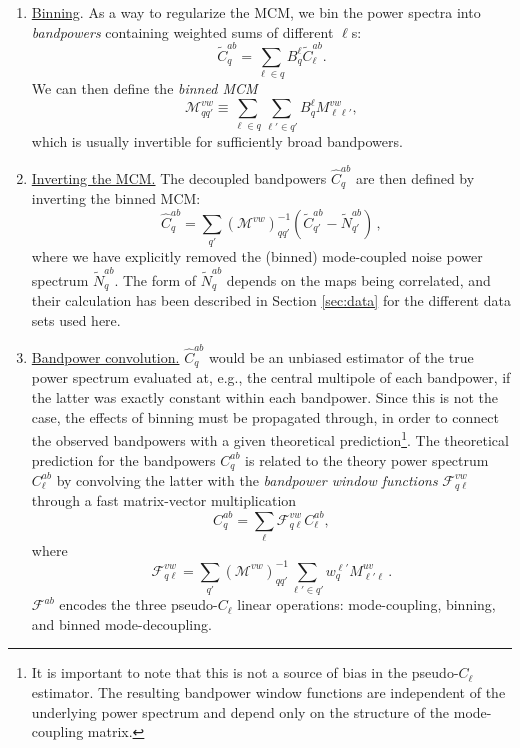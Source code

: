 \documentclass[a4paper,11pt]{article}
\newcommand{\cM}{\mathcal{M}} %
\newcommand{\cF}{\mathcal{F}} %
\begin{document}
      \begin{enumerate}
        \item \ul{Binning}. As a way to regularize the MCM, we bin the power spectra into \emph{bandpowers} containing weighted sums of different $\ell$s:
        \begin{equation}
          \tilde{C}^{ab}_q=\sum_{\ell\in q}B_q^\ell \tilde{C}^{ab}_\ell.
        \end{equation}
        We can then define the \emph{binned MCM}
        \begin{equation}
          \cM^{vw}_{qq'}\equiv\sum_{\ell\in q}\sum_{\ell'\in q'}B_q^\ell M^{vw}_{\ell\ell'},
        \end{equation}
        which is usually invertible for sufficiently broad bandpowers.
        \item \ul{Inverting the MCM.} The decoupled bandpowers $\hat{C}^{ab}_q$ are then defined by inverting the binned MCM:
        \begin{equation}
          \hat{C}_q^{ab} = \sum_{q'} (\cM^{vw})^{-1}_{q q'} (\tilde{C}_{q'}^{ab} - \tilde{N}^{ab}_{q'})\,,
        \end{equation}
        where we have explicitly removed the (binned) mode-coupled noise power spectrum $\tilde{N}^{ab}_q$. The form of $\tilde{N}^{ab}_q$ depends on the maps being correlated, and their calculation has been described in Section \ref{sec:data} for the different data sets used here.
        \item \ul{Bandpower convolution.} $\hat{C}^{ab}_q$ would be an unbiased estimator of the true power spectrum evaluated at, e.g., the central multipole of each bandpower, if the latter was exactly constant within each bandpower. Since this is not the case, the effects of binning must be propagated through, in order to connect the observed bandpowers with a given theoretical prediction\footnote{It is important to note that this is not a source of bias in the pseudo-$C_\ell$ estimator. The resulting bandpower window functions are independent of the underlying power spectrum and depend only on the structure of the mode-coupling matrix.}. The theoretical prediction for the bandpowers $C^{ab}_q$ is related to the theory power spectrum $C^{ab}_\ell$ by convolving the latter with the \emph{bandpower window functions} $\cF^{vw}_{q\ell}$ through a fast matrix-vector multiplication
        \begin{equation}
          C_q^{ab} = \sum_\ell \cF^{vw}_{q \ell} C^{ab}_\ell,
        \end{equation}
        where
        \begin{equation}
          \cF^{vw}_{q \ell} = \sum_{q'} (\cM^{vw})^{-1}_{q q'} \sum_{\ell' \in q'} w^{\ell'}_q M^{uv}_{\ell' \ell}\,.
        \end{equation}
        $\cF^{ab}$ encodes the three pseudo-$C_\ell$ linear operations: mode-coupling, binning, and binned mode-decoupling.
      \end{enumerate}
\end{document}

